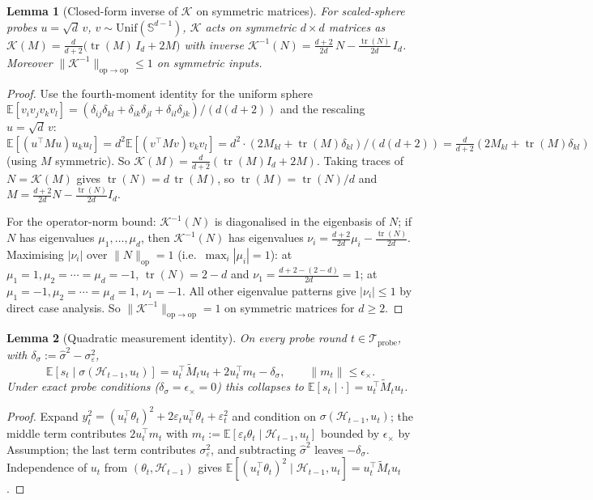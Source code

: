 \documentclass{article}
\newcommand{\E}{\mathbb{E}}
\newcommand{\op}{\mathrm{op}}
\newcommand{\cH}{\mathcal{H}}
\newcommand{\cTprobe}{\mathcal{T}_{\mathrm{probe}}}
\DeclareMathOperator{\tr}{tr}
\newtheorem{lemma}{Lemma}
\begin{document}
\begin{lemma}[Closed-form inverse of $\mathcal K$ on symmetric matrices]
\label{lem:K_inverse}
For scaled-sphere probes $u=\sqrt d\,v$, $v\sim\mathrm{Unif}(\mathbb S^{d-1})$,
$\mathcal K$ acts on symmetric $d\times d$ matrices as
$\mathcal K(M) = \tfrac{d}{d+2}\bigl(\tr(M)\,I_d + 2M\bigr)$ with inverse
$\mathcal K^{-1}(N) = \tfrac{d+2}{2d}\,N - \tfrac{\tr(N)}{2d}\,I_d$.
Moreover $\|\mathcal K^{-1}\|_{\op\to\op}\le 1$ on symmetric inputs.
\end{lemma}
\begin{proof}
Use the fourth-moment identity for the uniform sphere
$\E[v_iv_jv_kv_l] = (\delta_{ij}\delta_{kl}+\delta_{ik}\delta_{jl}+\delta_{il}\delta_{jk})/(d(d+2))$
and the rescaling $u=\sqrt d\,v$:
$\E[(u^\top M u)u_ku_l] = d^2 \E[(v^\top Mv)v_kv_l]
= d^2\cdot(2 M_{kl} + \tr(M)\delta_{kl})/(d(d+2))
= \tfrac{d}{d+2}(2M_{kl}+\tr(M)\delta_{kl})$
(using $M$ symmetric). So
$\mathcal K(M) = \tfrac{d}{d+2}(\tr(M)I_d + 2M)$. Taking traces of
$N=\mathcal K(M)$ gives $\tr(N) = d\,\tr(M)$, so
$\tr(M)=\tr(N)/d$ and
$M = \tfrac{d+2}{2d}N - \tfrac{\tr(N)}{2d}I_d$.

For the operator-norm bound: $\mathcal K^{-1}(N)$ is diagonalised in
the eigenbasis of $N$; if $N$ has eigenvalues $\mu_1,\dots,\mu_d$,
then $\mathcal K^{-1}(N)$ has eigenvalues
$\nu_i = \tfrac{d+2}{2d}\mu_i - \tfrac{\tr(N)}{2d}$. Maximising
$|\nu_i|$ over $\|N\|_\op = 1$ (i.e.\ $\max_i|\mu_i|=1$): at
$\mu_1=1,\mu_2=\cdots=\mu_d=-1$, $\tr(N)=2-d$ and
$\nu_1 = \tfrac{d+2-(2-d)}{2d} = 1$; at $\mu_1=-1,\mu_2=\cdots=\mu_d=1$,
$\nu_1 = -1$. All other eigenvalue patterns give $|\nu_i|\le 1$ by
direct case analysis. So $\|\mathcal K^{-1}\|_{\op\to\op} = 1$ on
symmetric matrices for $d\ge 2$.
\end{proof}

\begin{lemma}[Quadratic measurement identity]
\label{lem:quad_conf}
On every probe round $t\in\cTprobe$, with
$\delta_\sigma := \hat\sigma^2 - \sigma_\varepsilon^2$,
\[
\E[s_t\mid\sigma(\cH_{t-1},u_t)]
= u_t^\top \widetilde M_t u_t + 2 u_t^\top m_t
- \delta_\sigma,\qquad \|m_t\|\le\epsilon_\times.
\]
Under exact probe conditions ($\delta_\sigma=\epsilon_\times=0$) this
collapses to $\E[s_t\mid\cdot] = u_t^\top\widetilde M_t u_t$.
\end{lemma}
\begin{proof}
Expand $y_t^2 = (u_t^\top\theta_t)^2 + 2\varepsilon_t u_t^\top\theta_t
+ \varepsilon_t^2$ and condition on $\sigma(\cH_{t-1},u_t)$; the middle
term contributes $2u_t^\top m_t$ with
$m_t := \E[\varepsilon_t\theta_t\mid\cH_{t-1},u_t]$ bounded by
$\epsilon_\times$ by Assumption; the last term contributes
$\sigma_\varepsilon^2$, and subtracting $\hat\sigma^2$ leaves
$-\delta_\sigma$. Independence of $u_t$ from $(\theta_t,\cH_{t-1})$
gives $\E[(u_t^\top\theta_t)^2\mid\cH_{t-1},u_t] = u_t^\top\widetilde M_t u_t$.
\end{proof}
\end{document}
